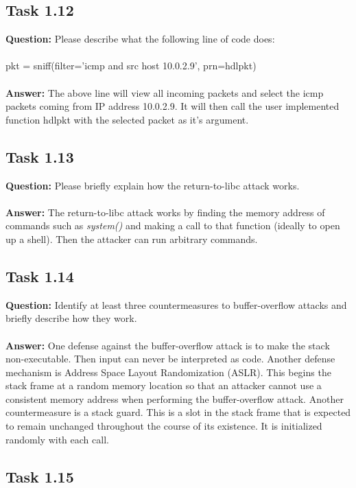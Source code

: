 \documentclass[11pt]{article}
\newcommand{\sys}{\textit{system()} }
\begin{document}
\subsection*{Task 1.12}

\textbf{Question: } Please describe what the following line of code does: \\\\
\indent pkt = sniff(filter='icmp and src host 10.0.2.9', prn=hdlpkt) \\\\
\textbf{Answer: } The above line will view all incoming packets and select the icmp packets coming from IP address 10.0.2.9. It will then call the user implemented function hdlpkt with the selected packet as it's argument.

\subsection*{Task 1.13}

\textbf{Question: } Please briefly explain how the return-to-libc attack works. \\\\
\textbf{Answer: } The return-to-libc attack works by finding the memory address of commands such as \sys and making a call to that function (ideally to open up a shell). Then the attacker can run arbitrary commands.

\subsection*{Task 1.14}

\textbf{Question: } Identify at least three countermeasures to buffer-overflow attacks and briefly describe how they work. \\\\
\textbf{Answer: } One defense against the buffer-overflow attack is to make the stack non-executable. Then input can never be interpreted as code. Another defense mechanism is Address Space Layout Randomization (ASLR). This begins the stack frame at a random memory location so that an attacker cannot use a consistent memory address when performing the buffer-overflow attack. Another countermeasure is a stack guard. This is a slot in the stack frame that is expected to remain unchanged throughout the course of its existence. It is initialized randomly with each call.

\subsection*{Task 1.15}
\end{document}
